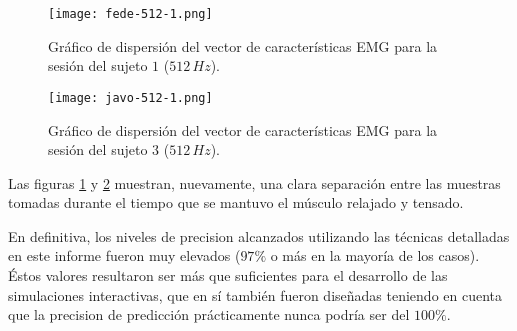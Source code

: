 \begin{figure}[H]
	\centering
    \texttt{[image: fede-512-1.png]}
    \caption{Gráfico de dispersión del vector de características EMG para la sesión del sujeto $1$ ($512\,Hz$).}
	\label{fig:emg-graph-s1-512}
\end{figure}

\begin{figure}[H]
	\centering
    \texttt{[image: javo-512-1.png]}
    \caption{Gráfico de dispersión del vector de características EMG para la sesión del sujeto $3$ ($512\,Hz$).}
	\label{fig:emg-graph-s3-512}
\end{figure}

Las figuras \ref{fig:emg-graph-s1-512} y \ref{fig:emg-graph-s3-512} muestran, nuevamente, una clara separación entre las muestras tomadas durante el tiempo que se mantuvo el músculo relajado y tensado.

En definitiva, los niveles de precision alcanzados utilizando las técnicas detalladas en este informe fueron muy elevados ($97\%$ o más en la mayoría de los casos). Éstos valores resultaron ser más que suficientes para el desarrollo de las simulaciones interactivas, que en sí también fueron diseñadas teniendo en cuenta que la precision de predicción prácticamente nunca podría ser del $100\%$.